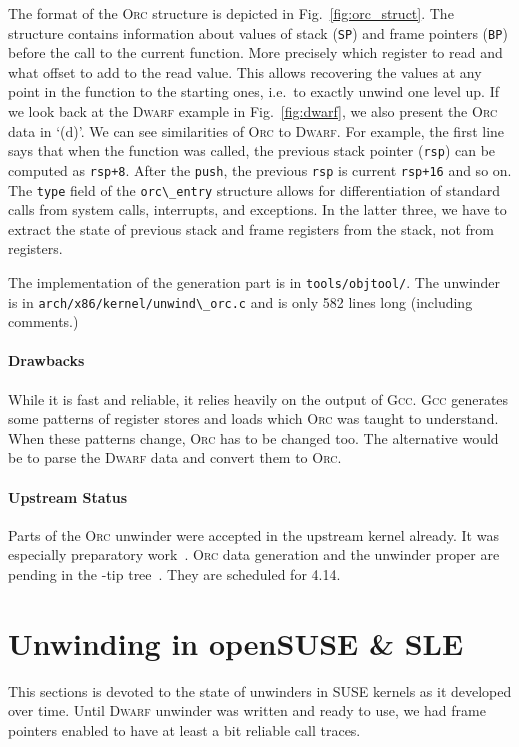 \documentclass[10pt]{llncs}
\newcommand{\code}[2][]{\lstinline[columns=fullflexible, #1]$#2$}
\newcommand{\codeasm}[2][]{\code[language={[x86masm]Assembler},
	morekeywords={rbp,rsp},#1]{#2}}
\newcommand{\file}[2][]{\code[language={}, #1]{#2}}
\newcommand{\dwarf}{\textsc{Dwarf}\xspace}
\newcommand{\gcc}{\textsc{Gcc}\xspace}
\newcommand{\orc}{\textsc{Orc}\xspace}
\begin{document}
The format of the \orc structure is depicted in Fig.~\ref{fig:orc_struct}. The
structure contains information about values of stack (\code{SP}) and
frame pointers (\code{BP}) before the call to the current function. More
precisely which register to read and what offset to add to the read value.
This allows recovering the values at any point in the function to the
starting ones, i.e.\ to exactly unwind one level up. If we look back at the
\dwarf example in Fig.~\ref{fig:dwarf}, we also present the \orc data in
`(d)'.  We can see similarities of \orc to \dwarf. For example, the first line
says that when the function was called, the previous stack pointer
(\codeasm{rsp}) can be computed as \codeasm{rsp+8}. After the \codeasm{push},
the previous \codeasm{rsp} is current \codeasm{rsp+16} and so on. The
\code{type} field of the \code{orc\_entry} structure allows for
differentiation of standard calls from system calls, interrupts, and
exceptions. In the latter three, we have to extract the state of previous
stack and frame registers from the stack, not from registers.

The implementation of the generation part is in \file{tools/objtool/}. The
unwinder is in \file{arch/x86/kernel/unwind\_orc.c} and is only 582 lines long
(including comments.)

\paragraph{Drawbacks} While it is fast and reliable, it relies heavily on the
output of \gcc. \gcc generates some patterns of register stores and loads
which \orc was taught to understand. When these patterns change, \orc has to
be changed too. The alternative would be to parse the \dwarf data and convert
them to \orc.

\paragraph{Upstream Status} Parts of the \orc unwinder were accepted in the
upstream kernel already.  It was especially preparatory
work~\cite{git_stack_val2}. \orc data generation and the unwinder proper are
pending in the -tip tree~\cite{git_orc_gen,git_orc_unw}. They are scheduled
for 4.14.

\section{Unwinding in openSUSE \& SLE} \label{sec:suse_unw}
This sections is devoted to the state of unwinders in SUSE kernels as it
developed over time.  Until \dwarf unwinder was written and ready to use, we
had frame pointers enabled to have at least a bit reliable call traces.
\end{document}
